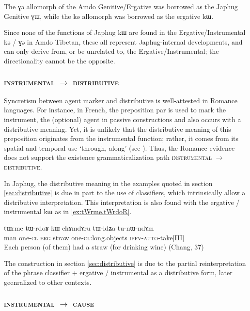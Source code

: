 \documentclass[oldfontcommands,oneside,a4paper,11pt]{article}
\newcommand{\ipa}[1]{{\phon #1}} %
\begin{document}
The \ipa{ɣə} allomorph of the Amdo Genitive/Ergative was borrowed as the Japhug Genitive \ipa{ɣɯ}, while the \ipa{kə} allomorph was borrowed  as the ergative \ipa{kɯ}. 

Since none of the functions of Japhug \ipa{kɯ} are found in the Ergative/Instrumental \ipa{kə} / \ipa{ɣə} in Amdo Tibetan, these all represent Japhug-internal developments, and can only derive from, or be unrelated to, the Ergative/Instrumental; the directionality cannot be the opposite.



 \subsubsection{\textsc{instrumental} $\rightarrow$ \textsc{distributive} }
  
Syncretism between agent marker and distributive is well-attested in Romance languages. For instance, in French, the preposition  \ipa{par}  is used to mark the instrument, the (optional) agent in passive constructions and also occurs with a distributive meaning. Yet, it is unlikely that the distributive meaning of this preposition originates from the instrumental function; rather, it comes from its  spatial and temporal use `through, along' (see \citealt[213]{wartburg58few8}). 
Thus, the Romance evidence does not support the existence grammaticalization path \textsc{instrumental} $\rightarrow$ \textsc{distributive}.

In Japhug, the distributive meaning in the examples quoted in section \ref{sec:distributive} is due in part to the use of classifiers, which intrinsically allow a distributive interpretation. This interpretation is also found with the ergative / instrumental \ipa{kɯ} as in \ref{ex:tWrme.tWrdoR}.
\begin{exe}
\ex \label{ex:tWrme.tWrdoR}
\gll 
\ipa{tɯrme}  	\ipa{tɯ-rdoʁ}  	\ipa{kɯ}  	\ipa{chɤmdɤru}  	\ipa{tɯ-ldʑa}  	\ipa{tu-nɯ-ndɤm}  \\
man one-\textsc{cl} \textsc{erg}  straw one-\textsc{cl}:long.objects \textsc{ipfv-auto}-take[III] \\
\glt Each person (of them) had a straw (for drinking wine) (Chang, 37)
\end{exe}
 
 The construction in section \ref{sec:distributive} is due to the partial reinterpretation of the phrase classifier + ergative / instrumental as a distributive form, later geenralized to other contexts.
 

 \subsubsection{\textsc{instrumental} $\rightarrow$ \textsc{cause}} \label{sec:instr2cause}
\end{document}
